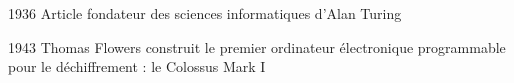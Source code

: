 \begin{frame}{1936}
    Article fondateur des sciences informatiques d'Alan Turing
\end{frame}

\begin{frame}{1943}
    Thomas Flowers construit le premier ordinateur électronique programmable pour le déchiffrement : le Colossus Mark I
\end{frame}

